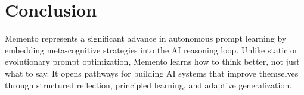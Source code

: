 \documentclass[10pt,a4paper,twocolumn]{article}
\begin{document}
\section{{Conclusion} }




 Memento represents a significant advance in autonomous prompt learning by embedding meta-cognitive strategies into the AI reasoning loop. Unlike static or evolutionary prompt optimization, Memento learns how to think better, not just what to say. It opens pathways for building AI systems that improve themselves through structured reflection, principled learning, and adaptive generalization.












\end{document}

